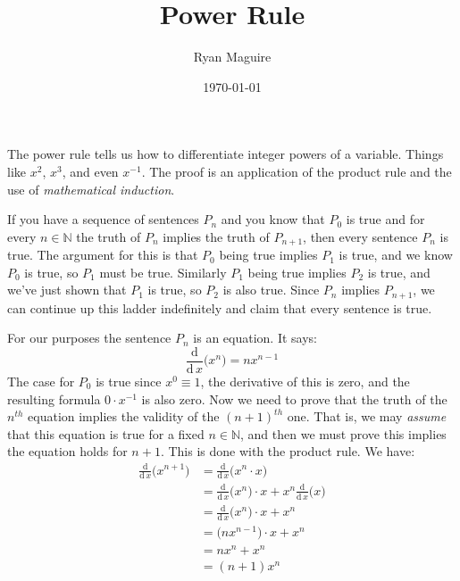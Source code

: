 \documentclass{article}
\title{Power Rule}
\author{Ryan Maguire}
\date{\today}
\theoremstyle{plain}
\begin{document}
    \maketitle
    The power rule tells us how to differentiate integer powers of a variable.
    Things like $x^{2}$, $x^{3}$, and even $x^{-1}$. The proof is an
    application of the product rule and the use of
    \textit{mathematical induction}.
    \par\hfill\par
    If you have a sequence of sentences
    $P_{n}$ and you know that $P_{0}$ is true and for every $n\in\mathbb{N}$
    the truth of $P_{n}$ implies the truth of $P_{n+1}$, then every sentence
    $P_{n}$ is true. The argument for this is that $P_{0}$ being true implies
    $P_{1}$ is true, and we know $P_{0}$ is true, so $P_{1}$ must be true.
    Similarly $P_{1}$ being true implies $P_{2}$ is true, and we've just shown
    that $P_{1}$ is true, so $P_{2}$ is also true. Since $P_{n}$ implies
    $P_{n+1}$, we can continue up this ladder indefinitely and claim that every
    sentence is true.
    \par\hfill\par
    For our purposes the sentence $P_{n}$ is an equation. It says:
    \begin{equation}
        \frac{\textrm{d}}{\textrm{d}\,x}\big(x^{n}\big)=nx^{n-1}
    \end{equation}
    The case for $P_{0}$ is true since $x^{0}\equiv{1}$, the derivative of this
    is zero, and the resulting formula $0\cdot{x}^{-1}$ is also zero.
    Now we need to prove that the truth of the $n^{th}$ equation implies the
    validity of the $(n+1)^{th}$ one. That is, we may \textit{assume} that
    this equation is true for a fixed $n\in\mathbb{N}$, and then we must prove
    this implies the equation holds for $n+1$. This is done with the product
    rule. We have:
    \begin{align}
        \frac{\textrm{d}}{\textrm{d}\,x}\big(x^{n+1}\big)
            &=\frac{\textrm{d}}{\textrm{d}\,x}\big(x^{n}\cdot{x}\big)
                \tag{Definition}\\
            &=\frac{\textrm{d}}{\textrm{d}\,x}\big(x^{n}\big)\cdot{x}
                +x^{n}\frac{\textrm{d}}{\textrm{d}\,x}\big(x\big)
                    \tag{Product Rule}\\
            &=\frac{\textrm{d}}{\textrm{d}\,x}\big(x^{n}\big)\cdot{x}+x^{n}
                    \tag{Derivative of $x$}\\
            &=\big(nx^{n-1}\big)\cdot{x}+x^{n}
                \tag{Induction Hypothesis}\\
            &=nx^{n}+x^{n}
                \tag{Simplify}\\
            &=(n+1)x^{n}
                \tag{Simplify}
    \end{align}
\end{document}
